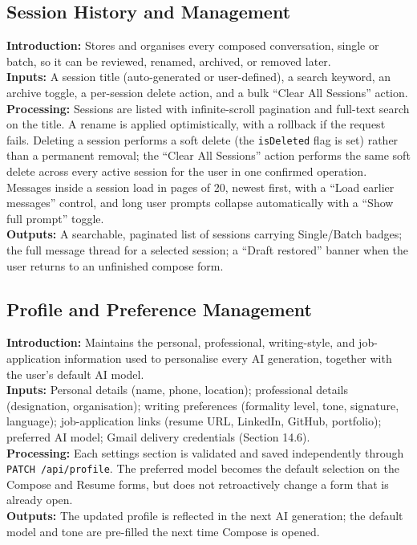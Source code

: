 \documentclass[12pt,a4paper]{article}
\begin{document}
\subsection{Session History and Management}
\noindent\textbf{Introduction:} Stores and organises every composed conversation, single or batch, so it can be reviewed, renamed, archived, or removed later.\\
\noindent\textbf{Inputs:} A session title (auto-generated or user-defined), a search keyword, an archive toggle, a per-session delete action, and a bulk ``Clear All Sessions'' action.\\
\noindent\textbf{Processing:} Sessions are listed with infinite-scroll pagination and full-text search on the title. A rename is applied optimistically, with a rollback if the request fails. Deleting a session performs a soft delete (the \texttt{isDeleted} flag is set) rather than a permanent removal; the ``Clear All Sessions'' action performs the same soft delete across every active session for the user in one confirmed operation. Messages inside a session load in pages of 20, newest first, with a ``Load earlier messages'' control, and long user prompts collapse automatically with a ``Show full prompt'' toggle.\\
\noindent\textbf{Outputs:} A searchable, paginated list of sessions carrying Single/Batch badges; the full message thread for a selected session; a ``Draft restored'' banner when the user returns to an unfinished compose form.

\subsection{Profile and Preference Management}
\noindent\textbf{Introduction:} Maintains the personal, professional, writing-style, and job-application information used to personalise every AI generation, together with the user's default AI model.\\
\noindent\textbf{Inputs:} Personal details (name, phone, location); professional details (designation, organisation); writing preferences (formality level, tone, signature, language); job-application links (resume URL, LinkedIn, GitHub, portfolio); preferred AI model; Gmail delivery credentials (Section 14.6).\\
\noindent\textbf{Processing:} Each settings section is validated and saved independently through \texttt{PATCH /api/profile}. The preferred model becomes the default selection on the Compose and Resume forms, but does not retroactively change a form that is already open.\\
\noindent\textbf{Outputs:} The updated profile is reflected in the next AI generation; the default model and tone are pre-filled the next time Compose is opened.
\end{document}

